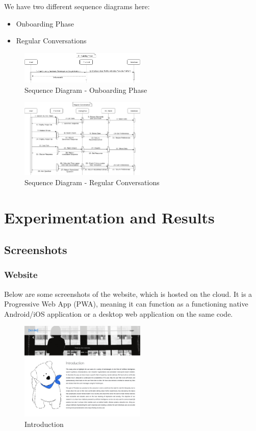 \documentclass[conference,compsoc]{IEEEtran}
\begin{document}
We have two different sequence diagrams here:
\begin{itemize}
    \item Onboarding Phase
    \item Regular Conversations
\end{itemize}

\begin{figure}[H]
    \centering
    \includegraphics[width=6cm]{images/sequence-diagram-onboarding-phase.png}
    \caption{Sequence Diagram - Onboarding Phase}
\end{figure}

\begin{figure}[H]
    \centering
    \includegraphics[width=6cm]{images/sequence-diagram-regular-conversations.png}
    \caption{Sequence Diagram - Regular Conversations}
\end{figure}


\section{Experimentation and Results}

\subsection{Screenshots}

\subsubsection{Website}

\noindent
Below are some screenshots of the website, which is hosted on the cloud. It is a Progressive Web App (PWA), meaning it can function as a functioning native Android/iOS application or a desktop web application on the same code.

\begin{figure}[H]
    \centering
    \includegraphics[width=6cm]{images/screenshots/website/website-introduction.png}
    \caption{Introduction}
\end{figure}
\end{document}
